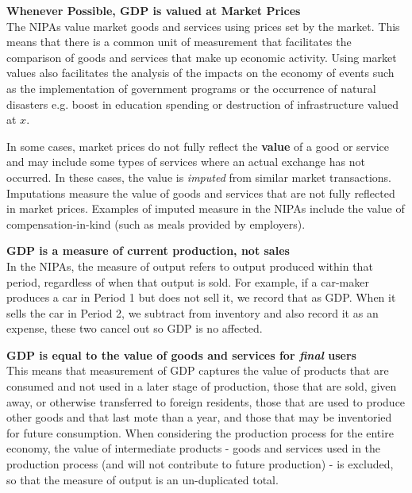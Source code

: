 \documentclass[12pt, letterpaper]{article}
\begin{document}
{\vspace{10pt}
\noindent\textbf{Whenever Possible, GDP is valued at Market Prices}\\
The NIPAs value market goods and services using prices set by the market. This means that there is a common unit of measurement that facilitates the comparison of goods and services that make up economic activity. Using market values also facilitates the analysis of the impacts on the economy of events such as the implementation of government programs or the occurrence of natural disasters e.g. boost in education spending or destruction of infrastructure valued at $x$.

In some cases, market prices do not fully reflect the \textbf{value} of a good or service and may include some types of services where an actual exchange has not occurred. In these cases, the value is \textit{imputed} from similar market transactions. Imputations measure the value of goods and services that are not fully reflected in market prices. Examples of imputed measure in the NIPAs include the value of compensation-in-kind (such as meals provided by employers).

\vspace{10pt}
\noindent\textbf{GDP is a measure of current production, not sales}\\
In the NIPAs, the measure of output refers to output produced within that period, regardless of when that output is sold. For example, if a car-maker produces a car in Period 1 but does not sell it, we record that as GDP. When it sells the car in Period 2, we subtract from inventory and also record it as an expense, these two cancel out so GDP is no affected.

\vspace{10pt}
\noindent\textbf{GDP is equal to the value of goods and services for \textit{final} users}\\
This means that measurement of GDP captures the value of products that are consumed and not used in a later stage of production, those that are sold, given away, or otherwise transferred to foreign residents, those that are used to produce other goods and that last mote than a year, and those that may be inventoried for future consumption. When considering the production process for the entire economy, the value of intermediate products - goods and services used in the production process (and will not contribute to future production) - is excluded, so that the measure of output is an un-duplicated total. 

}
\end{document}
